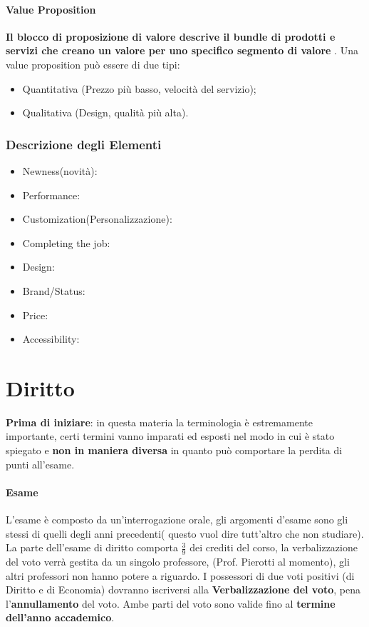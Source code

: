 \documentclass[twocolumn]{article}
\begin{document}
\subsection{Value Proposition}
\textbf{Il blocco di proposizione di valore descrive il bundle di prodotti e servizi che creano un valore per uno specifico segmento di valore }.
Una value proposition può essere di due tipi: \begin{itemize}
    \item Quantitativa (Prezzo più basso, velocità del servizio);
    \item Qualitativa (Design, qualità più alta).
\end{itemize}
\section{Descrizione degli Elementi}
\begin{itemize}
    \item Newness(novità):
    \item Performance:
    \item Customization(Personalizzazione):
    \item Completing the job:
    \item Design:
    \item Brand/Status:
    \item Price:
    \item Accessibility:
    
\end{itemize}


\clearpage\newpage
\part{Diritto}
\setcounter{section}{0}
\textbf{Prima di iniziare}: in questa materia la terminologia è estremamente importante, certi termini vanno imparati ed esposti nel modo in cui è stato spiegato e \textbf{non in maniera diversa} in quanto può comportare la perdita di punti all'esame.
\subsection{Esame}
L'esame è composto da un'interrogazione orale, gli argomenti d'esame sono gli stessi di quelli degli anni precedenti( questo vuol dire tutt'altro che non studiare). La parte dell'esame di diritto comporta $\frac{3}{9}$ dei crediti del corso, la verbalizzazione del voto verrà gestita da un singolo professore, (Prof. Pierotti al momento), gli altri professori non hanno potere a riguardo. I possessori di due voti positivi (di Diritto e di Economia) dovranno iscriversi alla \textbf{Verbalizzazione del voto}, pena l'\textbf{annullamento} del voto.  Ambe parti del voto sono valide fino al \textbf{termine dell'anno accademico}.
\end{document}
